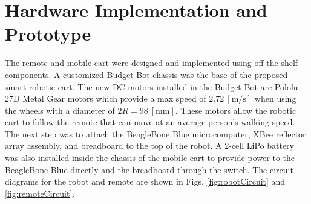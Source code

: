 \documentclass[conference]{IEEEtran}
\begin{document}
\section{Hardware Implementation and Prototype}
\label{sec:hardwareImplementation}



The remote and mobile cart were designed and implemented using off-the-shelf
components. A customized Budget Bot chassis was the base of the proposed smart
robotic cart. The new DC motors installed in the Budget Bot are Pololu 27D Metal
Gear motors which provide a max speed of $2.72~[\si{\meter\per\second}]$ when
using the wheels with a diameter of $2R = 98~[\si{\milli\meter}].$ These motors
allow the robotic cart to follow the remote that can move at an average person's
walking speed. The next step was to attach the BeagleBone Blue microcomputer,
XBee reflector array assembly, and breadboard to the top of the robot. A 2-cell
LiPo battery was also installed inside the chassis of the mobile cart to provide
power to the BeagleBone Blue directly and the breadboard through the
switch. %
The circuit diagrams for the robot and remote are shown in Figs.
\ref{fig:robotCircuit} and \ref{fig:remoteCircuit}. %
\end{document}
